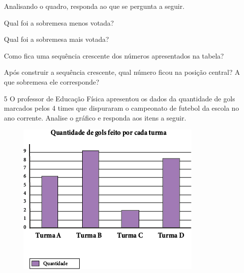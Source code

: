 Analisando o quadro, responda ao que se pergunta a seguir.

\begin{escolha}
\item
  Qual foi a sobremesa menos votada?\\

\item
  Qual foi a sobremesa mais votada?\\

\item
  Como fica uma sequência crescente dos números apresentados na tabela?\\

\item
  Após construir a sequência crescente, qual número ficou na posição
  central? A que sobremesa ele corresponde?\\
\end{escolha}

\num{5} O professor de Educação Física apresentou os dados da quantidade de gols
marcados pelos 4 times que dispuraram o campeonato de futebol da escola no ano
corrente. Analise o gráfico e responda aos itens a seguir.

\begin{figure}[htpb!]
\centering
\includegraphics[width=.85\textwidth]{media/image44.png}
\end{figure}

